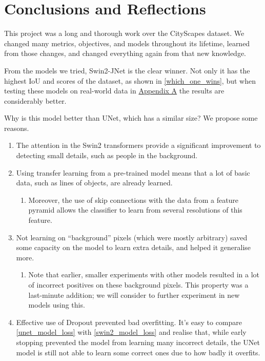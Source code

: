 \section{Conclusions and Reflections}

This project was a long and thorough work over the CityScapes dataset.
We changed many metrics, objectives, and models throughout its lifetime, learned from those changes, and changed everything again from that new knowledge.

From the models we tried, Swin2-JNet is the clear winner.
Not only it has the highest IoU and \iiouc{} scores of the dataset, as shown in \cref{which_one_wins}, but when testing these models on real-world data in \hyperref[hackneyscapes]{Appendix A} the results are considerably better.

Why is this model better than UNet, which has a similar size?
We propose some reasons.
\begin{enumerate}[topsep=0pt,itemsep=-3pt]
	\item The attention in the Swin2 transformers provide a significant improvement to detecting small details, such as people in the background.
	\item Using transfer learning from a pre-trained model means that a lot of basic data, such as lines of objects, are already learned.
		\vspace{-1ex}
		\begin{enumerate}
			\item Moreover, the use of skip connections with the data from a feature pyramid allows the classifier to learn from several resolutions of this feature.
		\end{enumerate}
	\item Not learning on ``background'' pixels (which were mostly arbitrary) saved some capacity on the model to learn extra details, and helped it generalise more.
		\vspace{-1ex}
		\begin{enumerate}
			\item Note that earlier, smaller experiments with other models resulted in a lot of incorrect positives on these background pixels.
				This property was a last-minute addition; we will consider to further experiment in new models using this.
		\end{enumerate}
	\item Effective use of Dropout prevented bad overfitting.
		It's easy to compare \cref{unet_model_loss} with \cref{swin2_model_loss} and realise that, while early stopping prevented the model from learning many incorrect details, the UNet model is still not able to learn some correct ones due to how badly it overfits.
\end{enumerate}

